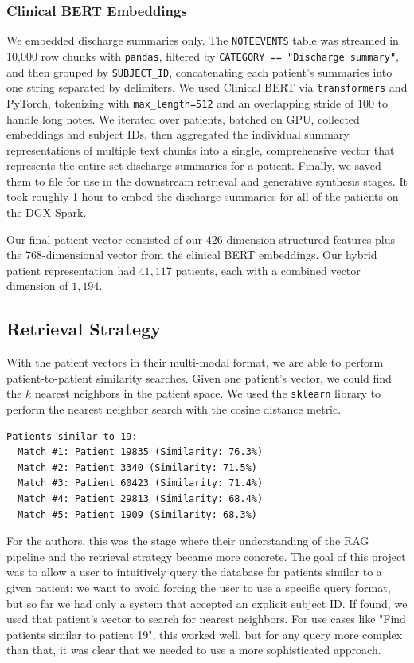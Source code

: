 \documentclass[acmtog]{acmart}
\begin{document}
\subsubsection{Clinical BERT Embeddings}
We embedded discharge summaries only. The \texttt{NOTEEVENTS} table was streamed in 10{,}000 row chunks with \texttt{pandas}, filtered by \texttt{CATEGORY == "Discharge summary"}, and then grouped by \texttt{SUBJECT\_ID}, concatenating each patient’s summaries into one string separated by delimiters. We used Clinical BERT  via \texttt{transformers} and PyTorch, tokenizing with \texttt{max\_length=512} and an overlapping stride of $100$ to handle long notes. We iterated over patients, batched on GPU, collected embeddings and subject IDs, then aggregated the individual summary representations of multiple text chunks into a single, comprehensive vector that represents the entire set discharge summaries for a patient. Finally, we saved them to file for use in the downstream retrieval and generative synthesis stages. It took roughly 1 hour to embed the discharge summaries for all of the patients on the DGX Spark.

\bigskip

Our final patient vector consisted of our $426$-dimension structured features plus the $768$-dimensional vector from the clinical BERT embeddings. Our hybrid patient representation had $41{,}117$ patients, each with a combined vector dimension of $1{,}194$.


\subsection{Retrieval Strategy}
With the patient vectors in their multi-modal format, we are able to perform patient-to-patient similarity searches. Given one patient's vector, we could find the $k$ nearest neighbors in the patient space. We used the \texttt{sklearn} library \cite{scikitlearn_neighbors_docs} to perform the nearest neighbor search with the cosine distance metric.


\begin{verbatim}
Patients similar to 19:
  Match #1: Patient 19835 (Similarity: 76.3%)
  Match #2: Patient 3340 (Similarity: 71.5%)
  Match #3: Patient 60423 (Similarity: 71.4%)
  Match #4: Patient 29813 (Similarity: 68.4%)
  Match #5: Patient 1909 (Similarity: 68.3%)
\end{verbatim}

For the authors, this was the stage where their understanding of the RAG pipeline and the retrieval strategy became more concrete. The goal of this project was to allow a user to intuitively query the database for patients similar to a given patient; we want to avoid forcing the user to use a specific query format, but so far we had only a system that accepted an explicit subject ID. If found, we used that patient's vector to search for nearest neighbors. For use cases like "Find patients similar to patient 19", this worked well, but for any query more complex than that, it was clear that we needed to use a more sophisticated approach.
\end{document}
